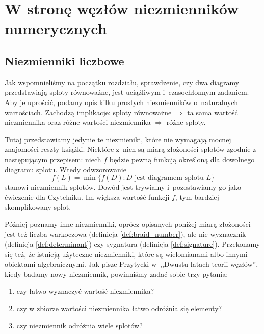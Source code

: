
\chapter{W stronę węzłów niezmienników numerycznych}
\section{Niezmienniki liczbowe}
Jak wspomnieliśmy na początku rozdziału, sprawdzenie, czy dwa diagramy przedstawiają sploty równoważne, jest uciążliwym i~czasochłonnym zadaniem.
Aby je uprościć, podamy opis kilku prostych niezmienników o~naturalnych wartościach.
Zachodzą implikacje:
sploty równoważne $\Rightarrow$ ta sama wartość niezmiennika
oraz różne wartości niezmiennika $\Rightarrow$ różne sploty.

Tutaj przedstawiamy jedynie te niezmieniki, które nie wymagają mocnej znajomości reszty książki.
Niektóre z~nich są miarą złożoności splotów zgodnie z następującym przepisem: niech $f$ będzie pewną funkcją określoną dla dowolnego diagramu splotu.
Wtedy odwzorowanie
\begin{equation}
    f(L) = \min \{f(D) : D \text{ jest diagramem splotu } L\}
\end{equation}
stanowi niezmiennik splotów.
Dowód jest trywialny i~pozostawiamy go jako ćwiczenie dla Czytelnika.
Im większa wartość funkcji $f$, tym bardziej skomplikowany splot.

Później poznamy inne niezmienniki, oprócz opisanych poniżej miarą złożoności jest też liczba warkoczowa (definicja \ref{def:braid_number}), ale nie wyznacznik (definicja \ref{def:determinant}) czy sygnatura (definicja \ref{def:signature}).
Przekonamy się też, że istnieją użyteczne niezmienniki, które są wielomianami albo innymi obiektami algebraicznymi.
Jak pisze Przytycki w~,,Dwustu latach teorii węzłów'', kiedy badamy nowy niezmiennik, powinniśmy zadać sobie trzy pytania:
\begin{enumerate}
    \item czy łatwo wyznaczyć wartość niezmiennika?
    \item czy w zbiorze wartości niezmiennika łatwo odróżnia się elementy?
    \item czy niezmiennik odróżnia wiele splotów?
\end{enumerate}







